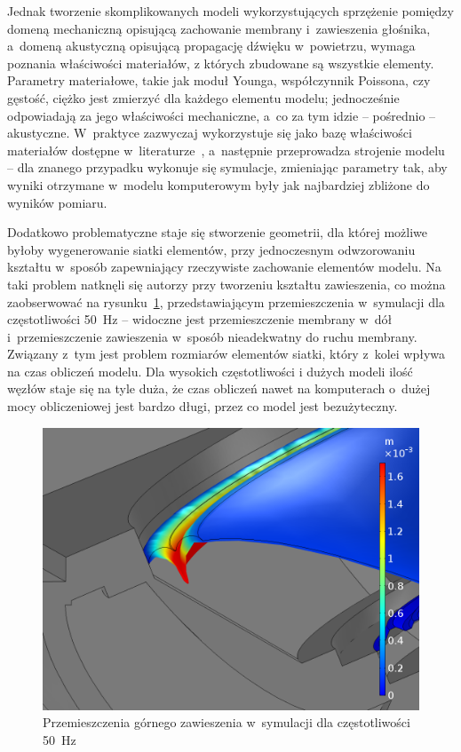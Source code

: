 \documentclass[12pt]{oska}
\begin{document}
	Jednak tworzenie skomplikowanych modeli wykorzystujących sprzężenie pomiędzy domeną mechaniczną opisującą zachowanie membrany i~zawieszenia głośnika, a~domeną akustyczną opisującą propagację dźwięku w~powietrzu, wymaga poznania właściwości materiałów, z których zbudowane są wszystkie elementy. Parametry materiałowe, takie jak moduł Younga, współczynnik Poissona, czy gęstość, ciężko jest zmierzyć dla każdego elementu modelu; jednocześnie odpowiadają za jego właściwości mechaniczne, a~co za tym idzie -- pośrednio -- akustyczne. W~praktyce zazwyczaj wykorzystuje się jako bazę właściwości materiałów dostępne w~literaturze~\cite{modelowanie}, a~następnie przeprowadza strojenie modelu -- dla znanego przypadku wykonuje się symulacje, zmieniając parametry tak, aby wyniki otrzymane w~modelu komputerowym były jak najbardziej zbliżone do wyników pomiaru.
	
	Dodatkowo problematyczne staje się stworzenie geometrii, dla której możliwe byłoby wygenerowanie siatki elementów, przy jednoczesnym odwzorowaniu kształtu w~sposób zapewniający rzeczywiste zachowanie elementów modelu. Na taki problem natknęli się autorzy przy tworzeniu kształtu zawieszenia, co można zaobserwować na rysunku~\ref{r:zawieszenie}, przedstawiającym przemieszczenia w~symulacji dla częstotliwości \SI{50}{\hertz} -- widoczne jest przemieszczenie membrany w~dół i~przemieszczenie zawieszenia w~sposób nieadekwatny do ruchu membrany.
	Związany z~tym jest problem rozmiarów elementów siatki, który z~kolei wpływa na czas obliczeń modelu. Dla wysokich częstotliwości i dużych modeli ilość węzłów staje się na tyle duża, że czas obliczeń nawet na komputerach o~dużej mocy obliczeniowej jest bardzo długi, przez co model jest bezużyteczny.
	
	\begin{figure}[!ht]
		\centering
		\includegraphics[width=.7\textwidth]{disp_factor5_f50_02.png}
		\caption{Przemieszczenia górnego zawieszenia w~symulacji dla częstotliwości \SI{50}{\hertz}}
		\label{r:zawieszenie}
	\end{figure}
	
\end{document}
